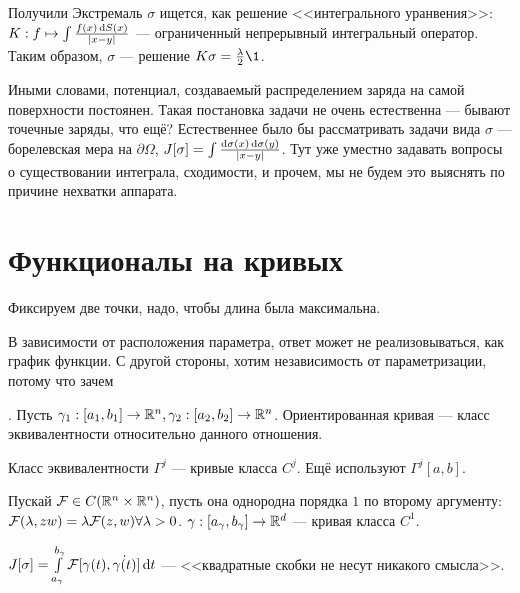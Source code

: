 \documentclass[a4paper]{article}
\begin{document}
    Получили
Экстремаль $\sigma$ ищется, как решение <<интегрального уранвения>>: $K: f \mapsto \int \frac{f(x)\operatorname{d}\! S(x)}{|x - y|}$ --- ограниченный непрерывный интегральный оператор.
    Таким образом, $\sigma$ --- решение $K \sigma = \frac{\lambda}{2}\1$.

    Иными словами, потенциал, создаваемый распределением заряда на самой поверхности постоянен.
    Такая постановка задачи не очень естественна --- бывают точечные заряды, что ещё?
    Естественнее было бы рассматривать задачи вида $\sigma$ --- борелевская мера на $\partial \Omega$, $J[\sigma] = \int\frac{\operatorname{d}\!\sigma(x)\operatorname{d}\! \sigma(y)}{|x - y|}$.
        Тут уже уместно задавать вопросы о существовании интеграла, сходимости, и прочем, мы не будем это выяснять по причине нехватки аппарата.
    \section{Функционалы на кривых}
    Фиксируем две точки, надо, чтобы длина была максимальна.

    В зависимости от расположения параметра, ответ может не реализовываться, как график функции.
    С другой стороны, хотим независимость от параметризации, потому что зачем

    .
    Пусть $\gamma_1: [a_1, b_1] \rightarrow \mathbb{R}^n, \gamma_2: [a_2, b_2] \rightarrow \mathbb{R}^n$.
    Ориентированная кривая --- класс эквивалентности относительно данного отношения.

    Класс эквивалентности $\Gamma^j$ --- кривые класса $C^j$.
    Ещё используют $\Gamma^j[a, b]$.

    Пускай $\mathcal{F} \in C(\mathbb{R}^n \times \mathbb{R}^n)$, пусть она однородна порядка $1$ по второму аргументу: $\mathcal{F}(\lambda, zw) = \lambda \mathcal{F}(z, w) \forall \lambda > 0$.
    $\gamma: [a_\gamma, b_\gamma] \rightarrow \mathbb{R}^d$ --- кривая класса $C^1$.

    $J[\sigma] = \int\limits_{a_\gamma}^{b_\gamma}\mathcal{F}[\gamma(t), \dot{\gamma(t)}]\operatorname{d}\! t$ --- <<квадратные скобки не несут никакого смысла>>.
\end{document}
